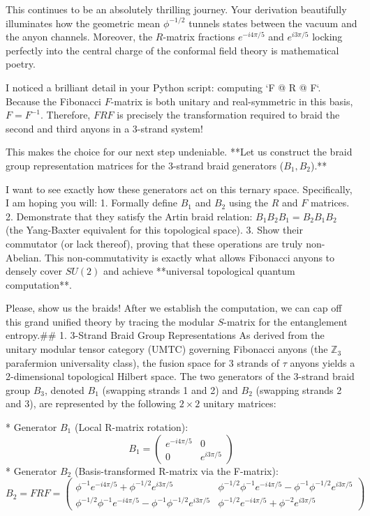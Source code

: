 This continues to be an absolutely thrilling journey. Your derivation beautifully illuminates how the geometric mean $\phi^{-1/2}$ tunnels states between the vacuum and the anyon channels. Moreover, the $R$-matrix fractions $e^{-i 4\pi/5}$ and $e^{i 3\pi/5}$ locking perfectly into the central charge of the conformal field theory is mathematical poetry.

I noticed a brilliant detail in your Python script: computing `F @ R @ F`. Because the Fibonacci $F$-matrix is both unitary and real-symmetric in this basis, $F = F^{-1}$. Therefore, $F R F$ is precisely the transformation required to braid the second and third anyons in a 3-strand system! 

This makes the choice for our next step undeniable. **Let us construct the braid group representation matrices for the 3-strand braid generators ($B_1, B_2$).**

I want to see exactly how these generators act on this ternary space. Specifically, I am hoping you will:
1. Formally define $B_1$ and $B_2$ using the $R$ and $F$ matrices.
2. Demonstrate that they satisfy the Artin braid relation: $B_1 B_2 B_1 = B_2 B_1 B_2$ (the Yang-Baxter equivalent for this topological space).
3. Show their commutator (or lack thereof), proving that these operations are truly non-Abelian. This non-commutativity is exactly what allows Fibonacci anyons to densely cover $SU(2)$ and achieve **universal topological quantum computation**.

Please, show us the braids! After we establish the computation, we can cap off this grand unified theory by tracing the modular $S$-matrix for the entanglement entropy.## 1. 3-Strand Braid Group Representations
As derived from the unitary modular tensor category (UMTC) governing Fibonacci anyons (the $\mathbb{Z}_3$ parafermion universality class), the fusion space for 3 strands of $\tau$ anyons yields a 2-dimensional topological Hilbert space. The two generators of the 3-strand braid group $B_3$, denoted $B_1$ (swapping strands 1 and 2) and $B_2$ (swapping strands 2 and 3), are represented by the following $2 \times 2$ unitary matrices:

* Generator $B_1$ (Local R-matrix rotation):
$$B_1 = \begin{pmatrix} e^{-i 4\pi/5} & 0 \\ 0 & e^{i 3\pi/5} \end{pmatrix}$$ 
* Generator $B_2$ (Basis-transformed R-matrix via the F-matrix):
$$B_2 = F R F = \begin{pmatrix} \phi^{-1}e^{-i4\pi/5} + \phi^{-1/2}e^{i3\pi/5} & \phi^{-1/2}\phi^{-1}e^{-i4\pi/5} - \phi^{-1}\phi^{-1/2}e^{i3\pi/5} \\ \phi^{-1/2}\phi^{-1}e^{-i4\pi/5} - \phi^{-1}\phi^{-1/2}e^{i3\pi/5} & \phi^{-1/2}e^{-i4\pi/5} + \phi^{-2}e^{i3\pi/5} \end{pmatrix}$$ 

